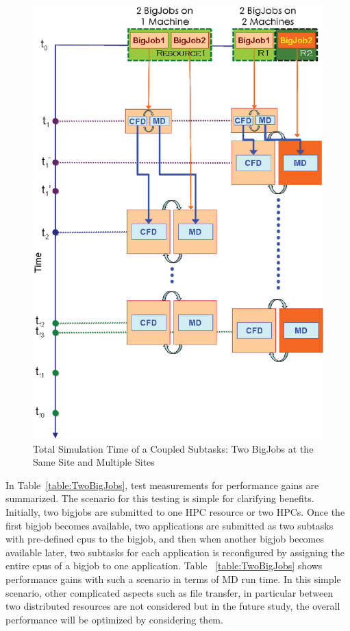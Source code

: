 \documentclass[conference,final]{IEEEtran}
\begin{document}
\begin{figure}
\centering
\includegraphics[scale=0.40]{Simulation_Time_of_Two_BigJobs.eps}
\caption{\small Total Simulation Time of a Coupled Subtasks: Two BigJobs at the Same Site 
and Multiple Sites}
\label{Fig:TwoBigJobs}
\end{figure}


In Table~\ref{table:TwoBigJobs}, test measurements for performance gains are summarized. 
The scenario for this testing is simple for clarifying benefits. Initially, two bigjobs 
are submitted to one HPC resource or two HPCs. Once the first bigjob becomes available, 
two applications are submitted as two subtasks with pre-defined cpus to the bigjob, and 
then when another bigjob becomes available later, two subtasks for each application is 
reconfigured by assigning the entire cpus of a bigjob to one application. Table 
~\ref{table:TwoBigJobs} shows performance gains with such a scenario in terms of MD run 
time. In this simple scenario, other complicated aspects such as file transfer, in 
particular between two distributed resources are not considered but in the future study, 
the overall performance will be optimized by considering them.
\end{document}
